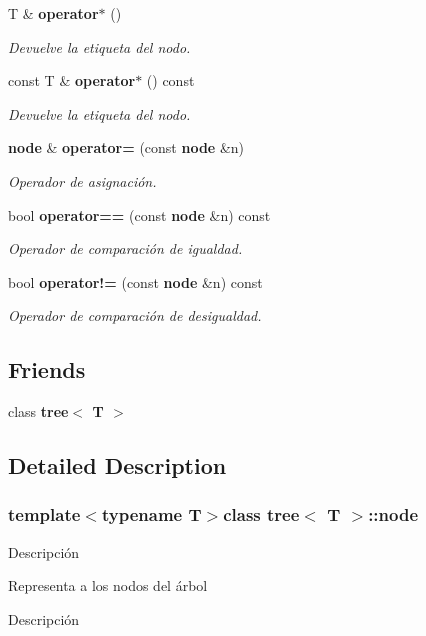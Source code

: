 \begin{DoxyCompactItemize}
T \& {\bf operator$\ast$} ()
\begin{DoxyCompactList}\small\item\em Devuelve la etiqueta del nodo. \end{DoxyCompactList}\item 
const T \& {\bf operator$\ast$} () const 
\begin{DoxyCompactList}\small\item\em Devuelve la etiqueta del nodo. \end{DoxyCompactList}\item 
{\bf node} \& {\bf operator=} (const {\bf node} \&n)
\begin{DoxyCompactList}\small\item\em Operador de asignación. \end{DoxyCompactList}\item 
bool {\bf operator==} (const {\bf node} \&n) const 
\begin{DoxyCompactList}\small\item\em Operador de comparación de igualdad. \end{DoxyCompactList}\item 
bool {\bf operator!=} (const {\bf node} \&n) const 
\begin{DoxyCompactList}\small\item\em Operador de comparación de desigualdad. \end{DoxyCompactList}\end{DoxyCompactItemize}
\subsection*{Friends}
\begin{DoxyCompactItemize}
\item 
class {\bf tree$<$ T $>$}
\end{DoxyCompactItemize}


\subsection{Detailed Description}
\subsubsection*{template$<$typename T$>$class tree$<$ T $>$\+::node}

Descripción

Representa a los nodos del árbol

Descripción

